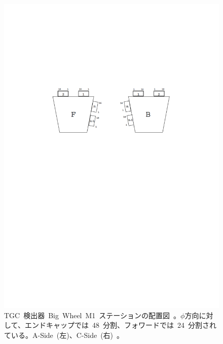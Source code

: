 \begin{figure}[tbp]
\begin{minipage}{0.49\hsize}
        \includegraphics[width=\textwidth,page=3]{img/pdf/TGC.pdf}
        \end{minipage}
        \caption[TGC 検出器~Big~Wheel~M1~ステーションの配置図]{TGC~検出器~Big~Wheel~M1~ステーションの配置図~\cite{TR:02}。$\phi$方向に対して、エンドキャップでは~48~分割、フォワードでは~24~分割されている。A-Side~(左)、C-Side~(右)~。}
        \label{fig:tgcBW}
\end{figure}

